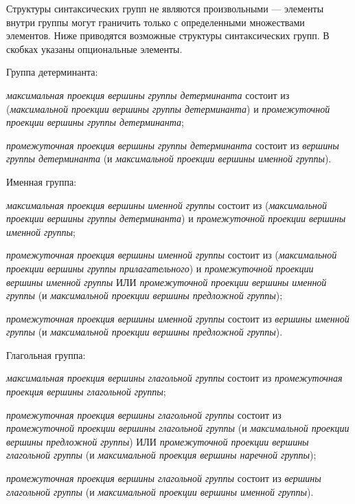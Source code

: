 Структуры синтаксических групп не являются произвольными --- элементы внутри группы могут граничить только с определенными множествами элементов.
Ниже приводятся возможные структуры синтаксических групп.
В скобках указаны опциональные элементы.

Группа детерминанта:
\begin{textitemize}
    \item \textit{максимальная проекция вершины группы детерминанта} состоит из (\textit{максимальной проекции вершины группы детерминанта}) и \textit{промежуточной проекции вершины группы детерминанта};
    \item \textit{промежуточная проекция вершины группы детерминанта} состоит из \textit{вершины группы детерминанта} (и \textit{максимальной проекции вершины именной группы}).
\end{textitemize}

Именная группа:
\begin{textitemize}
    \item \textit{максимальная проекция вершины именной группы} состоит из (\textit{максимальной проекции вершины группы детерминанта}) и \textit{промежуточной проекции вершины именной группы};
    \item \textit{промежуточная проекция вершины именной группы} состоит из (\textit{максимальной проекции вершины группы прилагательного}) и \textit{промежуточной проекции вершины именной группы} ИЛИ \textit{промежуточной проекции вершины именной группы} (и \textit{максимальной проекции вершины предложной группы});
    \item \textit{промежуточная проекция вершины именной группы} состоит из \textit{вершины именной группы} (и \textit{максимальной проекции вершины предложной группы}).
\end{textitemize}

Глагольная группа:
\begin{textitemize}
    \item \textit{максимальная проекция вершины глагольной группы} состоит из \textit{промежуточная проекция вершины глагольной группы};
    \item \textit{промежуточная проекция вершины глагольной группы} состоит из \textit{промежуточной проекции вершины глагольной группы} (и \textit{максимальной проекции вершины предложной группы}) ИЛИ \textit{промежуточной проекции вершины глагольной группы} (и \textit{максимальной проекция вершины наречной группы});
    \item \textit{промежуточная проекция вершины глагольной группы} состоит из \textit{вершины глагольной группы} (и \textit{максимальной проекции вершины именной группы}).
\end{textitemize}

